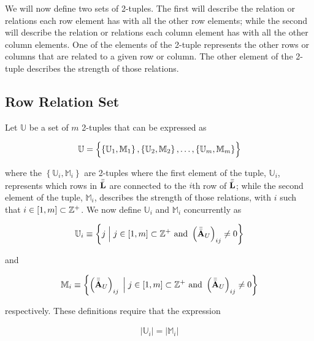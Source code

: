 \documentclass[../../ClusteringConnectionsMAIN.tex]{subfiles}
\begin{document}
\begin{flushleft}
\begin{large}


We will now define two sets of 2-tuples.  The first will describe the relation or relations each row element has with all the other row elements; while the second will describe the relation or relations each column element has with all the other column elements.  One of the elements of the 2-tuple represents the other rows or columns that are related to a given row or column.  The other element of the 2-tuple describes the strength of those relations. 


\subsection{Row Relation Set}

Let $\mathbb{U}$ be a set of $m$ 2-tuples that can be expressed as

\begin{align*}
\mathbb{U} = \Bigl\{ \left\{ \mathbb{U}_1, \mathbb{M}_1 \right\}, \left\{ \mathbb{U}_2, \mathbb{M}_2 \right\}, \dots, \left\{ \mathbb{U}_m, \mathbb{M}_m \right\} \Bigr\}
\end{align*}

where the $\left\{ \mathbb{U}_i, \mathbb{M}_i \right\}$ are 2-tuples where the first element of the tuple, $\mathbb{U}_i$, represents which rows in $\bar{\bar{\mathbf{L}}}$ are connected to the $i$th row of $\bar{\bar{\mathbf{L}}}$; while the second element of the tuple, $\mathbb{M}_i$, describes the strength of those relations, with $i$ such that $i \in \left[ 1, m \right] \subset \mathbb{Z}^+$.  We now define $\mathbb{U}_i$ and $\mathbb{M}_i$ concurrently as

\begin{align}
\mathbb{U}_i \equiv \left\{ j \; \Bigl| \Bigr. \; j \in \left[ 1, m \right] \subset \mathbb{Z}^+ \text{  and  } \left( \bar{\bar{\mathbf{A}}}_U \right)_{ij} \neq 0 \right\}
\end{align}

and

\begin{align}
\mathbb{M}_i \equiv \left\{ \left( \bar{\bar{\mathbf{A}}}_U \right)_{ij} \; \Bigl| \Bigr. \; j \in \left[ 1, m \right] \subset \mathbb{Z}^+ \text{  and  } \left( \bar{\bar{\mathbf{A}}}_U \right)_{ij} \neq 0 \right\}
\end{align}

respectively.  These definitions require that the expression

\begin{align*}
\bigl| \mathbb{U}_i \bigr| = \bigl| \mathbb{M}_i \bigr|
\end{align*}


\end{large}
\end{flushleft}
\end{document}
